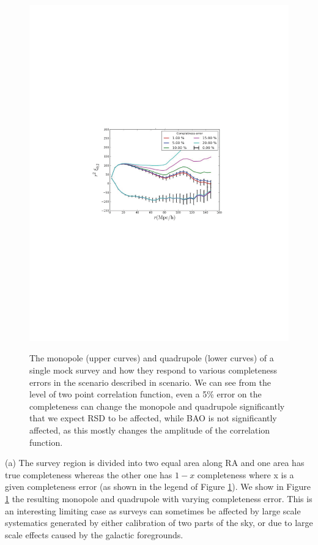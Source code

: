   \begin{figure}
   \vspace{-3in}
 \includegraphics[width = 7in]{Plots/GRS_req_1July2016_v3_P6fig.pdf}
 \label{fig:selection_function}
 \vspace{-3.5in}
 \caption{\footnotesize{The monopole (upper curves) and quadrupole (lower curves) of a single mock
 survey and how they respond to various completeness errors in the scenario described in scenario.
 We can see from the level of two point correlation function, even a 5\% error on the completeness
 can change the monopole   and quadrupole significantly that we expect RSD to be affected, while
 BAO is not significantly affected, as this mostly changes the amplitude of the correlation function.
 }}
 \end{figure}

 (a)	The survey region is divided into two equal area along RA and one area
 has true completeness whereas the other one has $1-x$ completeness where x is a
 given completeness error (as shown in the legend of Figure \ref{fig:selection_function}).
 We show in Figure \ref{fig:selection_function} the resulting monopole and quadrupole with varying completeness error. This
 is an interesting limiting case as surveys can sometimes be affected by large
 scale systematics generated by either calibration of two parts of the sky, or
 due to large scale effects caused by the galactic foregrounds.

